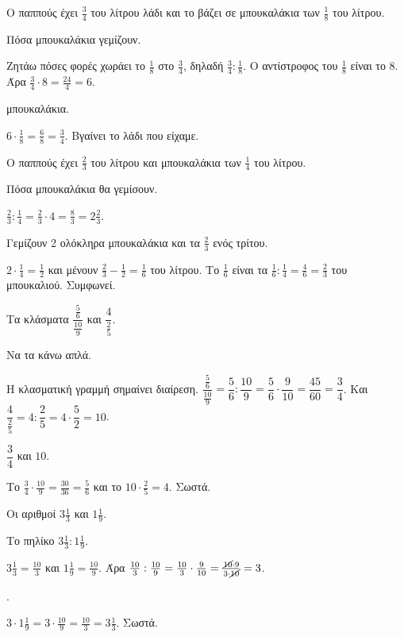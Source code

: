 
\tixero Ο παππούς έχει $\frac{3}{4}$ του λίτρου λάδι και το βάζει σε μπουκαλάκια των $\frac{1}{8}$ του λίτρου.\par
\tithelo Πόσα μπουκαλάκια γεμίζουν.\par
\possindeo Ζητάω πόσες φορές χωράει το $\frac{1}{8}$ στο $\frac{3}{4}$, δηλαδή $\frac{3}{4}:\frac{1}{8}$. Ο αντίστροφος του $\frac{1}{8}$ είναι το 8. Άρα $\frac{3}{4}\cdot 8=\frac{24}{4}=6$.\par
{} μπουκαλάκια.\par
\elegxos $6\cdot\frac{1}{8}=\frac{6}{8}=\frac{3}{4}$. Βγαίνει το λάδι που είχαμε.

\tixero Ο παππούς έχει $\frac{2}{3}$ του λίτρου και μπουκαλάκια των $\frac{1}{4}$ του λίτρου.\par
\tithelo Πόσα μπουκαλάκια θα γεμίσουν.\par
\possindeo $\frac{2}{3}:\frac{1}{4}=\frac{2}{3}\cdot 4=\frac{8}{3}=2\frac{2}{3}$.\par
\apantisi Γεμίζουν 2 ολόκληρα μπουκαλάκια και τα $\frac{2}{3}$ ενός τρίτου.\par
\elegxos $2\cdot\frac{1}{4}=\frac{1}{2}$ και μένουν $\frac{2}{3}-\frac{1}{2}=\frac{1}{6}$ του λίτρου. Το $\frac{1}{6}$ είναι τα $\frac{1}{6}:\frac{1}{4}=\frac{4}{6}=\frac{2}{3}$ του μπουκαλιού. Συμφωνεί.

\tixero Τα κλάσματα $\dfrac{\frac{5}{6}}{\frac{10}{9}}$ και $\dfrac{4}{\frac{2}{5}}$.\par
\tithelo Να τα κάνω απλά.\par
\possindeo Η κλασματική γραμμή σημαίνει διαίρεση. $\dfrac{\frac{5}{6}}{\frac{10}{9}}=\dfrac{5}{6}:\dfrac{10}{9}=\dfrac{5}{6}\cdot\dfrac{9}{10}=\dfrac{45}{60}=\dfrac{3}{4}$. Και $\dfrac{4}{\frac{2}{5}}=4:\dfrac{2}{5}=4\cdot\dfrac{5}{2}=10$.\par
\apantisi $\dfrac{3}{4}$ και $10$.\par
\elegxos Το $\frac{3}{4}\cdot\frac{10}{9}=\frac{30}{36}=\frac{5}{6}$ και το $10\cdot\frac{2}{5}=4$. Σωστά.

\tixero Οι αριθμοί $3\frac{1}{3}$ και $1\frac{1}{9}$.\par
\tithelo Το πηλίκο $3\frac{1}{3}:1\frac{1}{9}$.\par
\possindeo $3\frac{1}{3}=\frac{10}{3}$ και $1\frac{1}{9}=\frac{10}{9}$. Άρα $\frac{10}{3}:\frac{10}{9}=\frac{10}{3}\cdot\frac{9}{10}=\frac{\cancel{10}\cdot 9}{3\cdot\cancel{10}}=3$.\par
{}.\par
\elegxos $3\cdot 1\frac{1}{9}=3\cdot\frac{10}{9}=\frac{10}{3}=3\frac{1}{3}$. Σωστά.

